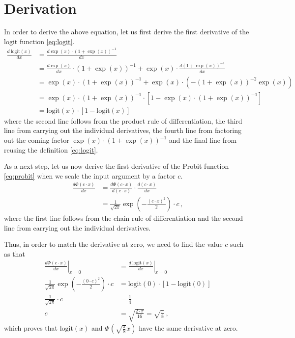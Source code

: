 \documentclass[a4paper]{article}
\begin{document}
\section*{Derivation}
In order to derive the above equation, let us first derive the first derivative of the logit function \eqref{eq:logit}. 
\begin{align*}
    \frac{d\ \mathrm{logit}(x)}{dx} & = \frac{d\exp(x)\cdot(1+\exp(x))^{-1}}{dx} \\
    & = \frac{d\exp(x)}{dx}\cdot(1+\exp(x))^{-1} + \exp(x)\cdot \frac{d(1+\exp(x))^{-1}}{dx} \\
    & = \exp(x)\cdot(1+\exp(x))^{-1} + \exp(x)\cdot \left(-(1+\exp(x))^{-2}\exp(x)\right) \\
    & = \exp(x)\cdot(1+\exp(x))^{-1}\cdot\left[1 - \exp(x)\cdot(1+\exp(x))^{-1}\right] \\
    & = \mathrm{logit}(x)\cdot\left[1 - \mathrm{logit}(x)\right] \, 
\end{align*}
where the second line follows from the product rule of differentiation, the third line from carrying out the individual derivatives, the fourth line from factoring out the coming factor $\exp(x)\cdot(1+\exp(x))^{-1}$ and the final line from reusing the definition \eqref{eq:logit}.

As a next step, let us now derive the first derivative of the Probit function \eqref{eq:probit} when we scale the input argument by a factor $c$.
\begin{align*}
    \frac{d\Phi(c\cdot x)}{dx} & =  \frac{d\Phi(c\cdot x)}{d(c\cdot x)} \cdot \frac{d(c\cdot x)}{dx} \\
    & = \frac{1}{\sqrt{2\pi}} \exp\left(-\frac{(c\cdot x)^2}{2}\right) \cdot c \,,
\end{align*}
where the first line follows from the chain rule of differentiation and the second line from carrying out the individual derivatives.

Thus, in order to match the derivative at zero, we need to find the value $c$ such as that 
\begin{align*}
    \left.\frac{d\Phi(c\cdot x)}{dx}\right|_{x=0} & = \left.\frac{d\ \mathrm{logit}(x)}{dx}\right|_{x=0} \\
    \frac{1}{\sqrt{2\pi}} \exp\left(-\frac{(0\cdot c)^2}{2}\right) \cdot c & = \mathrm{logit}(0)\cdot\left[1 - \mathrm{logit}(0)\right] \\
    \frac{1}{\sqrt{2\pi}} \cdot c & = \frac{1}{4} \\
    c & = \sqrt{\frac{2\cdot \pi}{16}} = \sqrt{\frac{\pi}{8}} \,,
\end{align*}
which proves that $\mathrm{logit}(x)$ and $\Phi\left(\sqrt{\frac{\pi}{8}}x\right)$ have the same derivative at zero.
\end{document}
